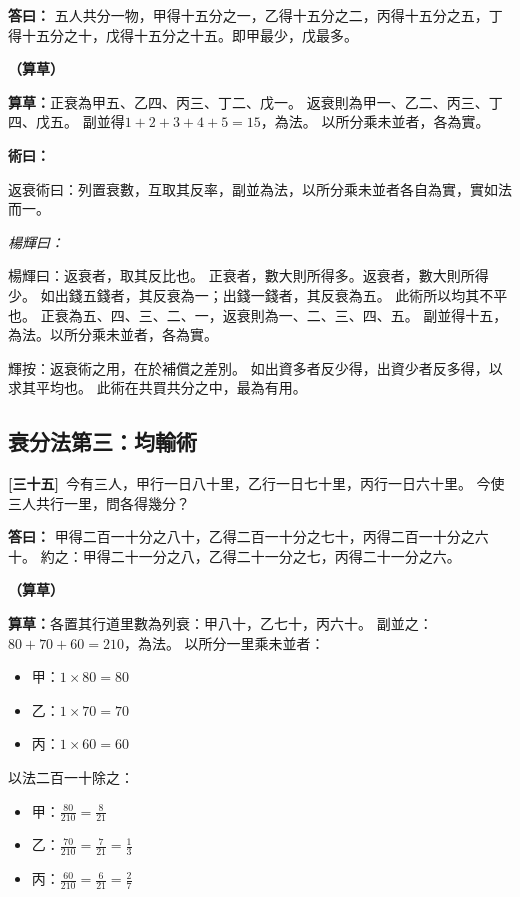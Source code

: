 \documentclass[11pt,a4paper]{article}
\newenvironment{method}{%
  \par\noindent\textcolor{methodcolor}{\textbf{術曰：}}%
  \ignorespaces
}{\par\vspace{0.5em}}
\newenvironment{caocao}{%
  \par\noindent\textcolor{caocaocolor}{\small\textbf{（算草）}}%
  \ignorespaces
}{\par\vspace{0.5em}}
\newenvironment{yanghuicomment}{%
  \par\noindent\textcolor{commentarycolor}{\small\textit{楊輝曰：}}%
  \ignorespaces
}{\par\vspace{0.5em}}
\newcommand{\problemnum}[1]{\textbf{[\ignorespaces#1\unskip]}}
\begin{document}
\noindent\textcolor{answercolor}{\textbf{答曰：}}
五人共分一物，甲得十五分之一，乙得十五分之二，丙得十五分之五，丁得十五分之十，戊得十五分之十五。即甲最少，戊最多。

\begin{caocao}
\textbf{算草：}正衰為甲五、乙四、丙三、丁二、戊一。
返衰則為甲一、乙二、丙三、丁四、戊五。
副並得$1 + 2 + 3 + 4 + 5 = 15$，為法。
以所分乘未並者，各為實。
\end{caocao}

\begin{method}
返衰術曰：列置衰數，互取其反率，副並為法，以所分乘未並者各自為實，實如法而一。
\end{method}

\begin{yanghuicomment}
楊輝曰：返衰者，取其反比也。
正衰者，數大則所得多。返衰者，數大則所得少。
如出錢五錢者，其反衰為一；出錢一錢者，其反衰為五。
此術所以均其不平也。
正衰為五、四、三、二、一，返衰則為一、二、三、四、五。
副並得十五，為法。以所分乘未並者，各為實。

輝按：返衰術之用，在於補償之差別。
如出資多者反少得，出資少者反多得，以求其平均也。
此術在共買共分之中，最為有用。
\end{yanghuicomment}

\subsection{衰分法第三：均輸術}

\noindent\problemnum{三十五}\,
今有三人，甲行一日八十里，乙行一日七十里，丙行一日六十里。
今使三人共行一里，問各得幾分？

\noindent\textcolor{answercolor}{\textbf{答曰：}}
甲得二百一十分之八十，乙得二百一十分之七十，丙得二百一十分之六十。
約之：甲得二十一分之八，乙得二十一分之七，丙得二十一分之六。

\begin{caocao}
\textbf{算草：}各置其行道里數為列衰：甲八十，乙七十，丙六十。
副並之：$80 + 70 + 60 = 210$，為法。
以所分一里乘未並者：
\begin{itemize}[leftmargin=3em]
\item 甲：$1 \times 80 = 80$
\item 乙：$1 \times 70 = 70$
\item 丙：$1 \times 60 = 60$
\end{itemize}
以法二百一十除之：
\begin{itemize}[leftmargin=3em]
\item 甲：$\frac{80}{210} = \frac{8}{21}$
\item 乙：$\frac{70}{210} = \frac{7}{21} = \frac{1}{3}$
\item 丙：$\frac{60}{210} = \frac{6}{21} = \frac{2}{7}$
\end{itemize}
\end{caocao}
\end{document}
